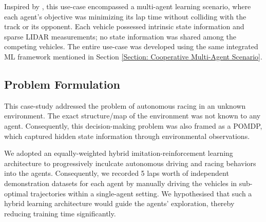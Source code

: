 \documentclass[letterpaper, 10 pt, conference]{ieeeconf}  %
\begin{document}
Inspired by \cite{AutoRACE-2021}, this use-case encompassed a multi-agent learning scenario, where each agent's objective was minimizing its lap time without colliding with the track or its opponent. Each vehicle possessed intrinsic state information and sparse LIDAR measurements; no state information was shared among the competing vehicles. The entire use-case was developed using the same integrated ML framework mentioned in Section \ref{Section: Cooperative Multi-Agent Scenario}.

\subsection{Problem Formulation}
\label{Sub-Section: Problem Formulation II}

This case-study addressed the problem of autonomous racing in an unknown environment. The exact structure/map of the environment was not known to any agent. Consequently, this decision-making problem was also framed as a POMDP, which captured hidden state information through environmental observations.

We adopted an equally-weighted hybrid imitation-reinforcement learning architecture to progressively inculcate autonomous driving and racing behaviors into the agents. Consequently, we recorded 5 laps worth of independent demonstration datasets for each agent by manually driving the vehicles in sub-optimal trajectories within a single-agent setting. We hypothesised that such a hybrid learning architecture would guide the agents' exploration, thereby reducing training time significantly.
\end{document}
